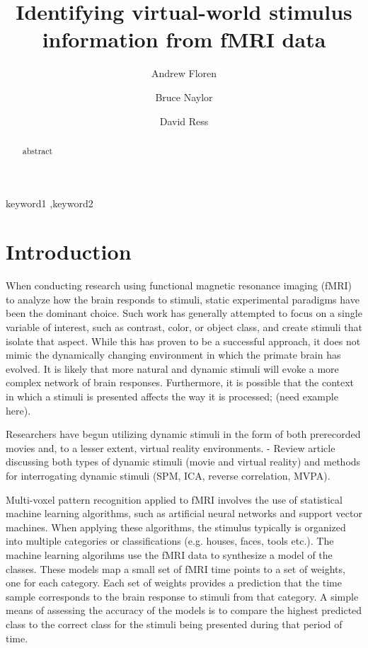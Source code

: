 \documentclass[preprint,5p,authoryear]{elsarticle}
\begin{document}
\begin{frontmatter}

\title{Identifying virtual-world stimulus information from fMRI data}

\author[UT]{Andrew Floren}

\author[UT]{Bruce Naylor}

\author[UT]{David Ress}

\address[UT]{The University of Texas at Austin, Austin, TX 78712 USA}


\begin{abstract}
abstract
\end{abstract}

\begin{keyword}
keyword1 \sep keyword2
\end{keyword}

\end{frontmatter}

\section{Introduction}
When conducting research using functional magnetic resonance imaging (fMRI) to analyze how the brain responds to stimuli, static experimental paradigms have been the dominant choice.
Such work has generally attempted to focus on a single variable of interest, such as contrast, color, or object class, and create stimuli that isolate that aspect.
While this has proven to be a successful approach, it does not mimic the dynamically changing environment in which the primate brain has evolved.
It is likely that more natural and dynamic stimuli will evoke a more complex network of brain responses.
Furthermore, it is possible that the context in which a stimuli is presented affects the way it is processed; (need example here).

Researchers have begun utilizing dynamic stimuli in the form of both prerecorded movies and, to a lesser extent, virtual reality environments.
\citep{Spiers2007} - Review article discussing both types of dynamic stimuli (movie and virtual reality) and methods for interrogating dynamic stimuli (SPM, ICA, reverse correlation, MVPA).

Multi-voxel pattern recognition applied to fMRI involves the use of statistical machine learning algorithms, such as artificial neural networks and support vector machines\citep{Haxby2001,Mitchell2003,Haynes2006}.
When applying these algorithms, the stimulus typically is organized into multiple categories or classifications (e.g. houses, faces, tools etc.).
The machine learning algorihms use the fMRI data to synthesize a model of the classes.
These models map a small set of fMRI time points to a set of weights, one for each category.
Each set of weights provides a prediction that the time sample corresponds to the brain response to stimuli from that category.
A simple means of assessing the accuracy of the models is to compare the highest predicted class to the correct class for the stimuli being presented during that period of time.
\end{document}
